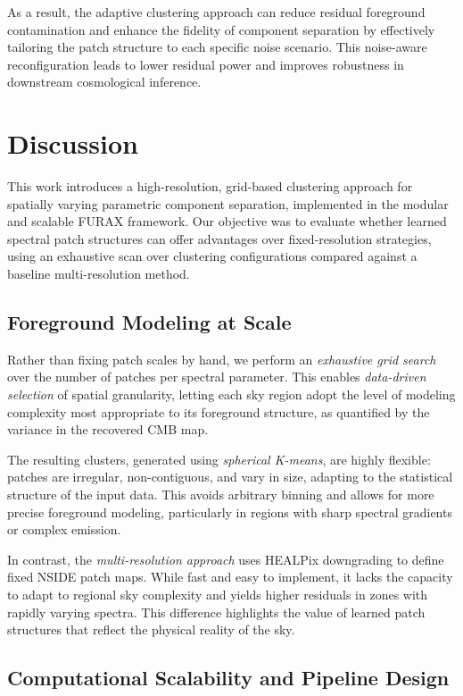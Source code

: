 \documentclass[%
 reprint,
bibnotes,
 amsmath,amssymb,
 aps,
floatfix, 
]{revtex4-2}
\begin{document}
As a result, the adaptive clustering approach can reduce residual foreground contamination and enhance the fidelity of component separation by effectively tailoring the patch structure to each specific noise scenario. This noise-aware reconfiguration leads to lower residual power and improves robustness in downstream cosmological inference.

\section{Discussion}
\label{sec:discussion}

This work introduces a high-resolution, grid-based clustering approach for spatially varying parametric component separation, implemented in the modular and scalable \textsc{FURAX} framework. Our objective was to evaluate whether learned spectral patch structures can offer advantages over fixed-resolution strategies, using an exhaustive scan over clustering configurations compared against a baseline multi-resolution method.

\subsection*{Foreground Modeling at Scale}

Rather than fixing patch scales by hand, we perform an \textit{exhaustive grid search} over the number of patches per spectral parameter. This enables \textit{data-driven selection} of spatial granularity, letting each sky region adopt the level of modeling complexity most appropriate to its foreground structure, as quantified by the variance in the recovered CMB map.

The resulting clusters, generated using \textit{spherical K-means}, are highly flexible: patches are irregular, non-contiguous, and vary in size, adapting to the statistical structure of the input data. This avoids arbitrary binning and allows for more precise foreground modeling, particularly in regions with sharp spectral gradients or complex emission.

In contrast, the \textit{multi-resolution approach} uses HEALPix downgrading to define fixed NSIDE patch maps. While fast and easy to implement, it lacks the capacity to adapt to regional sky complexity and yields higher residuals in zones with rapidly varying spectra. This difference highlights the value of learned patch structures that reflect the physical reality of the sky.

\subsection*{Computational Scalability and Pipeline Design}
\end{document}
